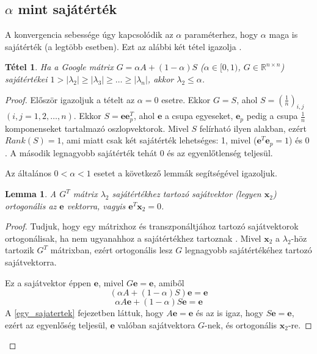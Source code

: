 \documentclass[12pt,a4paper]{article}
\newcommand{\bx}{\mathbf{x}}
\newcommand{\be}{\mathbf{e}}
\newtheorem{tetel}{Tétel}
\newtheorem{lemma}{Lemma}[tetel]
\begin{document}
\subsection{$\alpha$ mint sajátérték}\label{alfa_sajatertek}

A konvergencia sebessége úgy kapcsolódik az $\alpha$ paraméterhez, hogy $\alpha$ maga is sajátérték (a legtöbb esetben). Ezt az alábbi két tétel igazolja \cite{secondeigenvalue}. 

\vspace{0.1cm}
\begin{tetel}
		Ha a Google mátrix $G = \alpha A + (1-\alpha)S$ ($\alpha \in [0,1)$, $G \in \mathbb{R}^{n \times n}$) sajátértékei $ 1 > |\lambda_2| \geq |\lambda_3| \geq \ldots \geq |\lambda_n|$, akkor $\lambda_2 \leq \alpha$.
\end{tetel}
\begin{proof}
	
	Először igazoljuk a tételt az $\alpha = 0$ esetre. Ekkor $G = S$, ahol $S = (\frac{1}{n})_{i,j}$ $(i,j = 1,2,\ldots,n)$.
	Ekkor $S = \be \be_p^T$, ahol $\be$ a csupa egyeseket, $\be_p$ pedig a csupa $\frac{1}{n}$ komponenseket tartalmazó oszlopvektorok. Mivel $S$ felírható ilyen alakban, ezért $Rank(S) = 1$, ami miatt csak két sajátérték lehetséges: 1, mivel ($\be^T \be_p = 1$) és 0 \cite{rankonematrix}. A második legnagyobb sajátérték tehát 0 és az egyenlőtlenség teljesül.
	
	\vspace{0.1cm}
	\noindent
	Az általános $0 < \alpha < 1$ esetet a következő lemmák segítségével igazoljuk. 
	
	\begin{lemma}\label{orthogonal_lemma}
	 	A $G^T$ mátrix $\lambda_2$ sajátértékhez tartozó sajátvektor (legyen $\bx_2$) ortogonális az $\be$ vektorra, vagyis $\be^T \bx_2 = 0$.
	\end{lemma}
	\begin{proof}
		Tudjuk, hogy egy mátrixhoz és transzponáltjához tartozó sajátvektorok ortogonálisak, ha nem ugyanahhoz a sajátértékhez tartoznak \cite{orthogonal_eigenvectors}. Mivel $\bx_2$ a $\lambda_2$-höz tartozik $G^T$ mátrixban, ezért ortogonális lesz $G$ legnagyobb sajátértékéhez tartozó sajátvektorra. 
		
		Ez a sajátvektor éppen $\be$, mivel $ G \be = \be$, amiből
		\[  ( \alpha A + (1-\alpha) S ) \be = \be  \]
		\[  \alpha A \be + (1-\alpha) S \be = \be \]
		A \ref{egy_sajatertek} fejezetben láttuk, hogy $A \be = \be$ és az is igaz, hogy $S \be = \be$, ezért az egyenlőség teljesül, $\be$ valóban sajátvektora $G$-nek, és ortogonális $\bx_2$-re.	
	\end{proof}
	

\end{proof}
\end{document}

